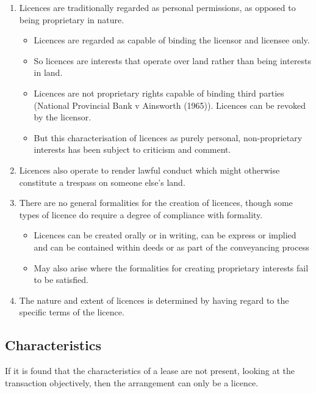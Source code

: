 \documentclass[
]{article}
\providecommand{\tightlist}{%
  \setlength{\itemsep}{0pt}\setlength{\parskip}{0pt}}
\begin{document}
\begin{enumerate}
\tightlist
\item
  Licences are traditionally regarded as personal permissions, as
  opposed to being proprietary in nature.

  \begin{itemize}
  \tightlist
  \item
    Licences are regarded as capable of binding the licensor and
    licensee only.
  \item
    So licences are interests that operate over land rather than being
    interests in land.
  \item
    Licences are not proprietary rights capable of binding third parties
    (National Provincial Bank v Ainsworth (1965)). Licences can be
    revoked by the licensor.
  \item
    But this characterisation of licences as purely personal,
    non-proprietary interests has been subject to criticism and comment.
  \end{itemize}
\item
  Licences also operate to render lawful conduct which might otherwise
  constitute a trespass on someone else's land.
\item
  There are no general formalities for the creation of licences, though
  some types of licence do require a degree of compliance with
  formality.

  \begin{itemize}
  \tightlist
  \item
    Licences can be created orally or in writing, can be express or
    implied and can be contained within deeds or as part of the
    conveyancing process
  \item
    May also arise where the formalities for creating proprietary
    interests fail to be satisfied.
  \end{itemize}
\item
  The nature and extent of licences is determined by having regard to
  the specific terms of the licence.
\end{enumerate}

\hypertarget{characteristics}{%
\subsection{Characteristics}\label{characteristics}}

If it is found that the characteristics of a lease are not present,
looking at the transaction objectively, then the arrangement can only be
a licence.
\end{document}
